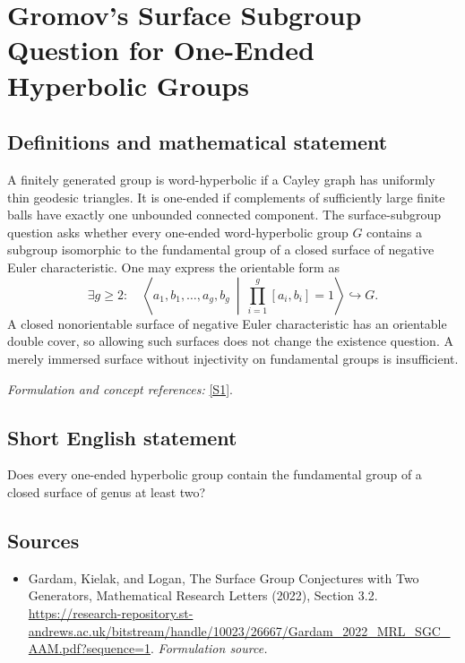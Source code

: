 \documentclass[11pt]{article}
\begin{document}
\section*{\texorpdfstring{Gromov's Surface Subgroup Question for One-Ended Hyperbolic Groups}{Gromov's Surface Subgroup Question for One-Ended Hyperbolic Groups}}\label{30006858}
\subsection{Definitions and mathematical statement}
A finitely generated group is word-hyperbolic if a Cayley graph has uniformly thin geodesic triangles. It is one-ended if complements of sufficiently large finite balls have exactly one unbounded connected component. The surface-subgroup question asks whether every one-ended word-hyperbolic group $G$ contains a subgroup isomorphic to the fundamental group of a closed surface of negative Euler characteristic. One may express the orientable form as
\[
 \exists g\ge2:\quad
 \left\langle a_1,b_1,\ldots,a_g,b_g\ \middle|\
 \prod_{i=1}^g[a_i,b_i]=1\right\rangle\hookrightarrow G.
\]
A closed nonorientable surface of negative Euler characteristic has an orientable double cover, so allowing such surfaces does not change the existence question. A merely immersed surface without injectivity on fundamental groups is insufficient.
\par\smallskip\textit{Formulation and concept references:} \href{https://research-repository.st-andrews.ac.uk/bitstream/handle/10023/26667/Gardam_2022_MRL_SGC_AAM.pdf?sequence=1}{[S1]}.

\subsection{Short English statement}
Does every one-ended hyperbolic group contain the fundamental group of a closed surface of genus at least two?
\subsection{Sources}
\begin{itemize}
\item[S1]Gardam, Kielak, and Logan, The Surface Group Conjectures with Two Generators, Mathematical Research Letters (2022), Section 3.2.
\url{https://research-repository.st-andrews.ac.uk/bitstream/handle/10023/26667/Gardam_2022_MRL_SGC_AAM.pdf?sequence=1}.
\textit{Formulation source.}
\end{itemize}
\end{document}
